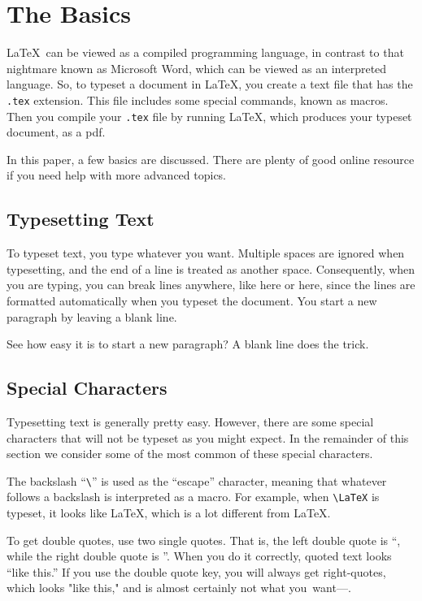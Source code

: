 \chapter{The Basics}

\LaTeX\ can be viewed
as a compiled programming language, in contrast to that 
nightmare known as Microsoft Word,
which can be viewed as an interpreted language. So, to typeset a
document in \LaTeX, you create a text file that has the {\tt .tex} extension.
This file includes some special
commands, known as macros. Then
you compile your {\tt .tex} file by running  \LaTeX,
which produces your typeset document, as a pdf. 

In this paper, a few basics are discussed. There are plenty of good online resource
if you need help with more advanced topics.


\section{Typesetting Text} 

To typeset text, you type whatever you want. Multiple spaces are
ignored                           when typesetting, and
the end of a line is treated as another space.
Consequently, when you are typing, you can break lines anywhere, like here
or here,
since the lines are formatted automatically when you typeset the document.
You start a new paragraph by leaving a blank line.

See how easy it is to start a new paragraph? A blank line does the trick.


\section{Special Characters}

Typesetting text is generally pretty easy. However, there are some special
characters that will not be typeset as you might expect. In the remainder of this
section we consider some of the most common of these
special characters. 

The backslash ``\verb+\+'' is used 
as the ``escape'' character, meaning that
whatever follows a backslash is interpreted as a macro.
For example, when \verb+\LaTeX+ is typeset, it looks like \LaTeX, which 
is a lot different from LaTeX.

To get double quotes, use two single quotes. That is, the left double quote is ``, while the right double
quote is ''. When you do it correctly, quoted text looks ``like this.''
If you use the double quote key, you will always get right-quotes, which looks "like this," and is
almost certainly not what you~want---.


